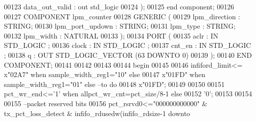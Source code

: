 \begin{DoxyCode}
00123         data_out_valid  : \textcolor{keywordflow}{out} \textcolor{comment}{std\_logic}       
00124         );
00125 \textcolor{keywordflow}{end} \textcolor{keywordflow}{component};
00126 
00127     \textcolor{keywordflow}{COMPONENT} lpm\_counter
00128     \textcolor{keywordflow}{GENERIC} (
00129         lpm\_direction           : \textcolor{comment}{STRING};
00130         lpm\_port\_updown     : \textcolor{comment}{STRING};
00131         lpm\_type                    : \textcolor{comment}{STRING};
00132         lpm\_width               : \textcolor{comment}{NATURAL}
00133     );
00134     \textcolor{keywordflow}{PORT} (
00135             aclr        : \textcolor{keywordflow}{IN} \textcolor{comment}{STD\_LOGIC} ;
00136             clock       : \textcolor{keywordflow}{IN} \textcolor{comment}{STD\_LOGIC} ;
00137             cnt\_en  : \textcolor{keywordflow}{IN} \textcolor{comment}{STD\_LOGIC} ;
00138             q           : \textcolor{keywordflow}{OUT} \textcolor{comment}{STD\_LOGIC\_VECTOR} (\textcolor{vhdllogic}{}\textcolor{vhdllogic}{63} \textcolor{keywordflow}{DOWNTO} \textcolor{vhdllogic}{}\textcolor{vhdllogic}{0})
00139     );
00140     \textcolor{keywordflow}{END} \textcolor{keywordflow}{COMPONENT};
00141     
00142     
00143   
00144 \textcolor{vhdlkeyword}{begin}
00145 
00146 \textcolor{vhdlchar}{infiford_limit}\textcolor{vhdlchar}{<=}    \textcolor{vhdlchar}{x}\textcolor{vhdllogic}{"02A7"} \textcolor{keywordflow}{when} \textcolor{vhdlchar}{sample_width_reg1}\textcolor{vhdlchar}{=}\textcolor{vhdllogic}{"10"} \textcolor{keywordflow}{else} 
00147                         \textcolor{vhdlchar}{x}\textcolor{vhdllogic}{"01FD"} \textcolor{keywordflow}{when} \textcolor{vhdlchar}{sample_width_reg1}\textcolor{vhdlchar}{=}\textcolor{vhdllogic}{"01"} \textcolor{keywordflow}{else}\textcolor{keyword}{ --to do}
00148                         \textcolor{vhdlchar}{x}\textcolor{vhdllogic}{"01FD"};
00149 
00150 
00151 \textcolor{vhdlchar}{pct_wr_end}\textcolor{vhdlchar}{<=}\textcolor{vhdlchar}{'}\textcolor{vhdllogic}{}\textcolor{vhdllogic}{1}\textcolor{vhdlchar}{'} \textcolor{keywordflow}{when} \textcolor{vhdlchar}{allpct_wr_cnt}\textcolor{vhdlchar}{=}\textcolor{vhdlchar}{pct_size}\textcolor{vhdlchar}{/}\textcolor{vhdllogic}{8-1} \textcolor{keywordflow}{else} 
00152             \textcolor{vhdlchar}{'}\textcolor{vhdllogic}{}\textcolor{vhdllogic}{0}\textcolor{vhdlchar}{'};
00153   
00154   
00155 \textcolor{keyword}{--packet reserved bits  }
00156   \textcolor{vhdlchar}{pct_rsrvd0}\textcolor{vhdlchar}{<=}\textcolor{vhdllogic}{"000000000000"} \textcolor{vhdlchar}{&} \textcolor{vhdlchar}{tx_pct_loss_detect} \textcolor{vhdlchar}{&} \textcolor{vhdlchar}{infifo_rdusedw}\textcolor{vhdlchar}{(}\textcolor{vhdlchar}{infifo_rdsize}\textcolor{vhdlchar}{-}\textcolor{vhdllogic}{}\textcolor{vhdllogic}{1} \textcolor{keywordflow}{downto} \textcolor{vhdlchar}{
}
\end{DoxyCode}
